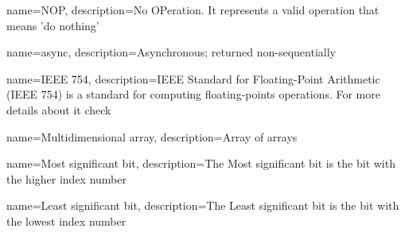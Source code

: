  {
	name=NOP,
	description={No OPeration. It represents a valid operation that means 'do nothing'}
}

 {
	name=async,
	description={Asynchronous; returned non-sequentially}
}

 {
	name=IEEE 754,
	description={IEEE Standard for Floating-Point Arithmetic (IEEE 754) is a standard for computing floating-points operations. For more details about it check \cite{IEEE-754}}
}

 {
	name=Multidimensional array,
	description={Array of arrays}
}

 {
	name=Most significant bit,
	description={The Most significant bit is the bit with the higher index number}
}

 {
	name=Least significant bit,
	description={The Least significant bit is the bit with the lowest index number}
}
